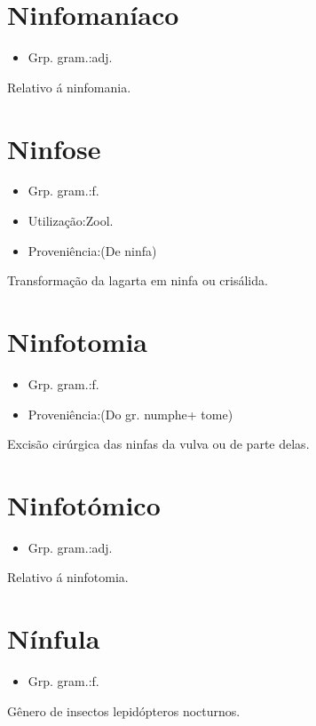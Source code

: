 \section{Ninfomaníaco}
\begin{itemize}
\item {Grp. gram.:adj.}
\end{itemize}
Relativo á ninfomania.
\section{Ninfose}
\begin{itemize}
\item {Grp. gram.:f.}
\end{itemize}
\begin{itemize}
\item {Utilização:Zool.}
\end{itemize}
\begin{itemize}
\item {Proveniência:(De \textunderscore ninfa\textunderscore )}
\end{itemize}
Transformação da lagarta em ninfa ou crisálida.
\section{Ninfotomia}
\begin{itemize}
\item {Grp. gram.:f.}
\end{itemize}
\begin{itemize}
\item {Proveniência:(Do gr. \textunderscore numphe\textunderscore  + \textunderscore tome\textunderscore )}
\end{itemize}
Excisão cirúrgica das ninfas da vulva ou de parte delas.
\section{Ninfotómico}
\begin{itemize}
\item {Grp. gram.:adj.}
\end{itemize}
Relativo á ninfotomia.
\section{Nínfula}
\begin{itemize}
\item {Grp. gram.:f.}
\end{itemize}
Gênero de insectos lepidópteros nocturnos.

